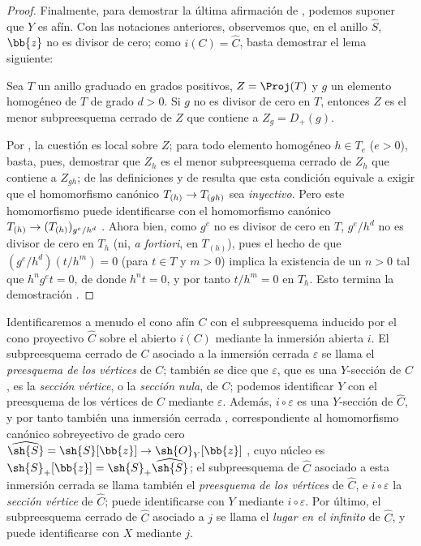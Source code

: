 \documentclass[oneside,10pt]{amsart}
\makeatletter
\newcommand{\ega@arrow}[2]{\mathchoice{#1}{#2}{#2}{#2}}
\renewcommand{\to}{\ega@arrow{\longrightarrow}{\rightarrow}}
\let\EGAOriginalLabel\label
\renewcommand{\label}[1]{\phantomsection\EGAOriginalLabel{#1}}
\makeatother
\begin{document}
\begin{proof}
Finalmente, para demostrar la última afirmación de , podemos suponer que $Y$ es afín.
Con las notaciones anteriores, observemos que, en el anillo $\widehat{S}$, $\bb{z}$ no es divisor de cero;
como $i(C)=\widehat{C}$, basta demostrar el lema siguiente:
\begin{lemma}[8.3.2.7]
\label{II.8.3.2.7}
Sea $T$ un anillo graduado en grados positivos, $Z=\Proj(T)$ y $g$ un elemento homogéneo de $T$ de grado $d>0$.
Si $g$ no es divisor de cero en $T$, entonces $Z$ es el menor subpreesquema cerrado de $Z$ que contiene a $Z_g=D_+(g)$.
\end{lemma}

Por , la cuestión es local sobre $Z$;
para todo elemento homogéneo $h\in T_e$ ($e>0$), basta, pues, demostrar que $Z_h$ es el menor subpreesquema cerrado de $Z_h$ que contiene a $Z_{gh}$;
de las definiciones y de  resulta que esta condición equivale a exigir que el homomorfismo canónico $T_{(h)}\to T_{(gh)}$ sea \emph{inyectivo}.
Pero este homomorfismo puede identificarse con el homomorfismo canónico $T_{(h)}\to(T_{(h)})_{g^e/h^d}$ .
Ahora bien, como $g^e$ no es divisor de cero en $T$, $g^e/h^d$ no es divisor de cero en $T_h$ (ni, \emph{a fortiori}, en $T_{(h)}$), pues el hecho de que $(g^e/h^d)(t/h^m)=0$ (para $t\in T$ y $m>0$) implica la existencia de un $n>0$ tal que $h^ng^et=0$, de donde $h^nt=0$, y por tanto $t/h^m=0$ en $T_h$.
Esto termina la demostración .
\end{proof}
\begin{env}[8.3.3]
\label{II.8.3.3}
Identificaremos a menudo el cono afín $C$ con el subpreesquema inducido por el cono proyectivo $\widehat{C}$ sobre el abierto $i(C)$ mediante la inmersión abierta $i$.
El subpreesquema cerrado de $C$ asociado a la inmersión cerrada $\varepsilon$ se llama el \emph{preesquema de los vértices} de $C$;
también se dice que $\varepsilon$, que es una $Y$-sección de $C$, es la \emph{sección vértice}, o la \emph{sección nula}, de $C$;
podemos identificar $Y$ con el preesquema de los vértices de $C$ mediante $\varepsilon$.
Además, $i\circ\varepsilon$ es una $Y$-sección de $\widehat{C}$, y por tanto también una inmersión cerrada , correspondiente al homomorfismo canónico sobreyectivo de grado cero $\widehat{\sh{S}} = \sh{S}[\bb{z}] \to \sh{O}_Y[\bb{z}]$ , cuyo núcleo es $\sh{S}_+[\bb{z}] = \sh{S}_+\widehat{\sh{S}}$;
el subpreesquema de $\widehat{C}$ asociado a esta inmersión cerrada se llama también el \emph{preesquema de los vértices} de $\widehat{C}$, e $i\circ\varepsilon$ la \emph{sección vértice} de $\widehat{C}$;
puede identificarse con $Y$ mediante $i\circ\varepsilon$.
Por último, el subpreesquema cerrado de $\widehat{C}$ asociado a $j$ se llama el \emph{lugar en el infinito} de $\widehat{C}$, y puede identificarse con $X$ mediante $j$.
\end{env}
\end{document}
